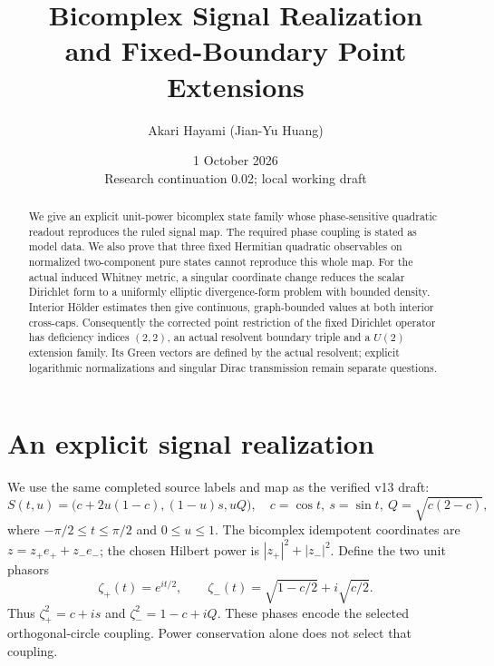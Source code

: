 \documentclass[11pt]{article}
\title{Bicomplex Signal Realization\\and Fixed-Boundary Point Extensions}
\author{Akari Hayami (Jian-Yu Huang)}
\date{1 October 2026\\\small Research continuation 0.02; local working draft}
\theoremstyle{remark}\newtheorem{remark}[theorem]{Remark}
\begin{document}
\maketitle
\begin{abstract}
We give an explicit unit-power bicomplex state family whose phase-sensitive
quadratic readout reproduces the ruled signal map. The required phase coupling
is stated as model data. We also prove that three fixed Hermitian quadratic
observables on normalized two-component pure states cannot reproduce this
whole map. For the actual induced Whitney metric, a singular coordinate change
reduces the scalar Dirichlet form to a uniformly elliptic divergence-form
problem with bounded density. Interior H\"older estimates then give continuous,
graph-bounded values at both interior cross-caps. Consequently the corrected
point restriction of the fixed Dirichlet operator has deficiency indices
$(2,2)$, an actual resolvent boundary triple and a $U(2)$ extension family.
Its Green vectors are defined by the actual resolvent; explicit logarithmic
normalizations and singular Dirac transmission remain separate questions.
\end{abstract}

\section{An explicit signal realization}\label{sec:realization}
We use the same completed source labels and map as the verified v13 draft:
\[
 S(t,u)=\bigl(c+2u(1-c),(1-u)s,uQ\bigr),\quad
 c=\cos t,\ s=\sin t,\ Q=\sqrt{c(2-c)},
\]
where $-\pi/2\leq t\leq\pi/2$ and $0\leq u\leq1$.
The bicomplex idempotent coordinates are $z=z_+e_++z_-e_-$;
the chosen Hilbert power is $|z_+|^2+|z_-|^2$.
Define the two unit phasors
\[
 \zeta_+(t)=e^{it/2},\qquad
 \zeta_-(t)=\sqrt{1-c/2}+i\sqrt{c/2}.
\]
Thus $\zeta_+^2=c+is$ and $\zeta_-^2=1-c+iQ$.
These phases encode the selected orthogonal-circle coupling. Power
conservation alone does not select that coupling.
\end{document}
